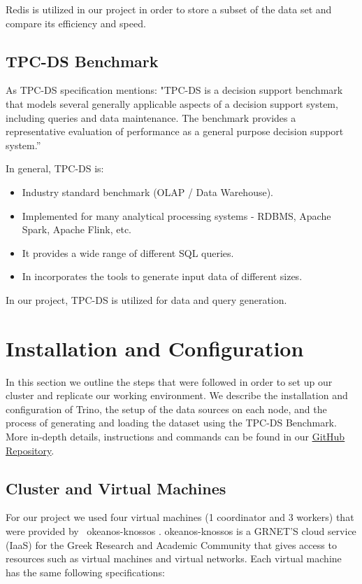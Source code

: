 \documentclass[conference]{IEEEtran}
\begin{document}
Redis is utilized in our project in order to store a subset of the data set and compare its efficiency and speed.

\subsection{TPC-DS Benchmark}
\label{sec:tpc-ds-benchmark}

As TPC-DS specification \cite{b8} mentions: "TPC-DS is a decision support benchmark that models several generally applicable
aspects of a decision support system, including queries and data maintenance. The benchmark provides a representative evaluation
of performance as a general purpose decision support system.”

In general, TPC-DS is:

\begin{itemize}
	\item Industry standard benchmark (OLAP / Data Warehouse).
	\item Implemented for many analytical processing systems - RDBMS, Apache Spark, Apache Flink, etc.
	\item It provides a wide range of different SQL queries.
	\item In incorporates the tools to generate input data of different sizes.
\end{itemize}

In our project, TPC-DS is utilized for data and query generation.

\section{Installation and Configuration}

In this section we outline the steps that were followed in order to set up our cluster and replicate our working
environment. We describe the installation and configuration of Trino, the setup of the data sources
on each node, and the process of generating and loading the dataset using the TPC-DS Benchmark.
More in-depth details, instructions and commands can be found in our \textcolor{linkblue}{\underline{\href{https://github.com/alex1on/Information-Systems-NTUA}{GitHub Repository}}}.
\subsection{Cluster and Virtual Machines}
\label{sec:cluster-and-virtual-machines}

For our project we used four virtual machines (1 coordinator and 3 workers) that were provided by ~okeanos-knossos \cite{b12}.
okeanos-knossos is a GRNET'S cloud service (IaaS) for the Greek Research and Academic Community that gives access to resources such as
virtual machines and virtual networks. Each virtual machine has the same following specifications:
\end{document}
